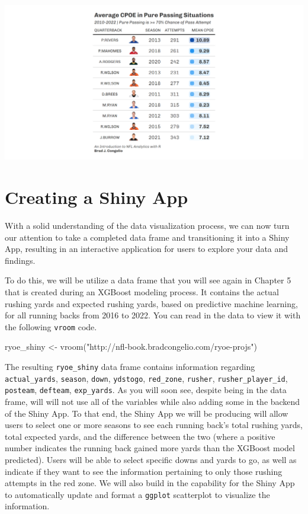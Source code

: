 \documentclass[
  letterpaper,
]{krantz}
\newenvironment{Shaded}{\begin{snugshade}}{\end{snugshade}}
\newcommand{\FunctionTok}[1]{\textcolor[rgb]{0.28,0.35,0.67}{#1}}
\newcommand{\NormalTok}[1]{\textcolor[rgb]{0.00,0.23,0.31}{#1}}
\newcommand{\OtherTok}[1]{\textcolor[rgb]{0.00,0.23,0.31}{#1}}
\newcommand{\StringTok}[1]{\textcolor[rgb]{0.13,0.47,0.30}{#1}}
\begin{document}
\includegraphics[width=6.61in,height=\textheight]{images/gt_table_5.png}

\hypertarget{creating-a-shiny-app}{%
\section{Creating a Shiny App}\label{creating-a-shiny-app}}

With a solid understanding of the data visualization process, we can now
turn our attention to take a completed data frame and transitioning it
into a Shiny App, resulting in an interactive application for users to
explore your data and findings.

To do this, we will be utilize a data frame that you will see again in
Chapter 5 that is created during an XGBoost modeling process. It
contains the actual rushing yards and expected rushing yards, based on
predictive machine learning, for all running backs from 2016 to 2022.
You can read in the data to view it with the following \texttt{vroom}
code.

\begin{Shaded}
\begin{Highlighting}[]
\NormalTok{ryoe\_shiny }\OtherTok{\textless{}{-}} \FunctionTok{vroom}\NormalTok{(}\StringTok{"http://nfl{-}book.bradcongelio.com/ryoe{-}projs"}\NormalTok{)}
\end{Highlighting}
\end{Shaded}

The resulting \texttt{ryoe\_shiny} data frame contains information
regarding \texttt{actual\_yards}, \texttt{season}, \texttt{down},
\texttt{ydstogo}, \texttt{red\_zone}, \texttt{rusher},
\texttt{rusher\_player\_id}, \texttt{posteam}, \texttt{defteam},
\texttt{exp\_yards}. As you will soon see, despite being in the data
frame, will will not use all of the variables while also adding some in
the backend of the Shiny App. To that end, the Shiny App we will be
producing will allow users to select one or more seasons to see each
running back's total rushing yards, total expected yards, and the
difference between the two (where a positive number indicates the
running back gained more yards than the XGBoost model predicted). Users
will be able to select specific downs and yards to go, as well as
indicate if they want to see the information pertaining to only those
rushing attempts in the red zone. We will also build in the capability
for the Shiny App to automatically update and format a \texttt{ggplot}
scatterplot to visualize the information.
\end{document}
